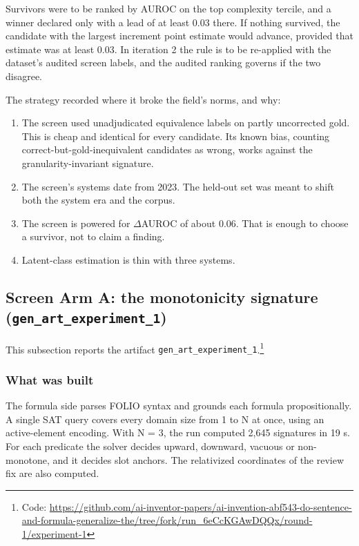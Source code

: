 \documentclass[11pt,letterpaper]{article}
\begin{document}
Survivors were to be ranked by AUROC on the top complexity tercile, and a winner declared only with a lead of at least 0.03 there. If nothing survived, the candidate with the largest increment point estimate would advance, provided that estimate was at least 0.03. In iteration 2 the rule is to be re-applied with the dataset's audited screen labels, and the audited ranking governs if the two disagree.

The strategy recorded where it broke the field's norms, and why:

\begin{enumerate}
\item {}The screen used unadjudicated equivalence labels on partly uncorrected gold. This is cheap and identical for every candidate. Its known bias, counting correct-but-gold-inequivalent candidates as wrong, works against the granularity-invariant signature.
\item {}The screen's systems date from 2023. The held-out set was meant to shift both the system era and the corpus.
\item {}The screen is powered for $\Delta$AUROC of about 0.06. That is enough to choose a survivor, not to claim a finding.
\item {}Latent-class estimation is thin with three systems.
\end{enumerate}
\subsection{Screen Arm A: the monotonicity signature (\texorpdfstring{\textup{\nolinkurl{gen_art_experiment_1}}}{gen art experiment 1})}

This subsection reports the artifact \texorpdfstring{\textup{\nolinkurl{gen_art_experiment_1}}}{gen art experiment 1}.\footnote{Code: \url{https://github.com/ai-inventor-papers/ai-invention-abf543-do-sentence-and-formula-generalize-the/tree/fork/run_6eCcKGAwDQQx/round-1/experiment-1}}

\subsubsection{What was built}

The formula side parses FOLIO syntax and grounds each formula propositionally. A single SAT query covers every domain size from 1 to N at once, using an active-element encoding. With N = 3, the run computed 2,645 signatures in 19 s. For each predicate the solver decides upward, downward, vacuous or non-monotone, and it decides slot anchors. The relativized coordinates of the review fix are also computed.
\end{document}
